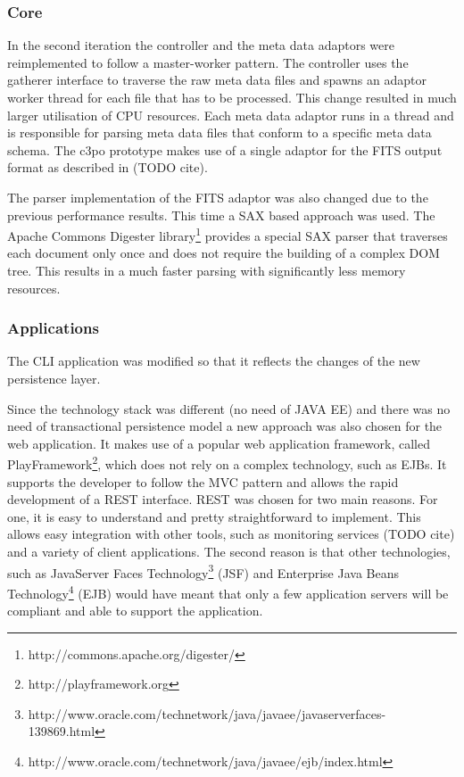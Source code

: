 \subsubsection{Core}
In the second iteration the controller and the meta data adaptors were reimplemented to follow a master-worker pattern.
The controller uses the gatherer interface to traverse the raw meta data files and spawns an adaptor worker thread for each file that has to be processed. This change resulted in much larger utilisation of CPU resources. Each meta data adaptor runs in a thread and is responsible for parsing meta data files that conform to a specific meta data schema. The c3po prototype makes use of a single adaptor for the FITS output format as described in (TODO cite). 

The parser implementation of the FITS adaptor was also changed due to the previous performance results. This time a SAX based approach was used. The Apache Commons Digester library\footnote{http://commons.apache.org/digester/} provides a special SAX parser that traverses each document only once and does not require the building of a complex DOM tree. This results in a much faster parsing with significantly less memory resources.

\subsubsection{Applications}
The CLI application was modified so that it reflects the changes of the new persistence layer.

Since the technology stack was different (no need of JAVA EE) and there was no need of transactional persistence model a new approach was also chosen for the web application. It makes use of a popular web application framework, called PlayFramework\footnote{http://playframework.org}, which does not rely on a complex technology, such as EJBs. It supports the developer to follow the MVC pattern and allows the rapid development of a REST \cite{Fielding:2000:ASD:932295} interface. REST was chosen for two main reasons. For one, it is easy to understand and pretty straightforward to implement. This allows easy integration with other tools, such as monitoring services (TODO cite) and a variety of client applications. The second reason is that other technologies, such as JavaServer Faces Technology\footnote{http://www.oracle.com/technetwork/java/javaee/javaserverfaces-139869.html} (JSF) and Enterprise Java Beans Technology\footnote{http://www.oracle.com/technetwork/java/javaee/ejb/index.html} (EJB) would have meant that only a few application servers will be compliant and able to support the application.

